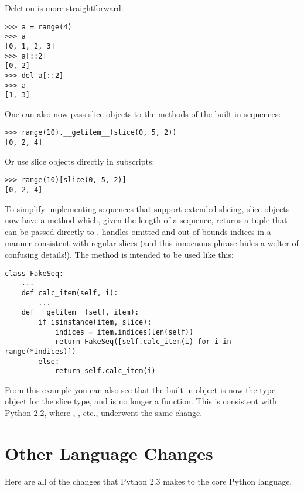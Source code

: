 \documentclass{howto}
\begin{document}
Deletion is more straightforward:

\begin{verbatim}
>>> a = range(4)
>>> a
[0, 1, 2, 3]
>>> a[::2]
[0, 2]
>>> del a[::2]
>>> a
[1, 3]
\end{verbatim}

One can also now pass slice objects to the
 methods of the built-in sequences:

\begin{verbatim}
>>> range(10).__getitem__(slice(0, 5, 2))
[0, 2, 4]
\end{verbatim}

Or use slice objects directly in subscripts:

\begin{verbatim}
>>> range(10)[slice(0, 5, 2)]
[0, 2, 4]
\end{verbatim}

To simplify implementing sequences that support extended slicing,
slice objects now have a method  which,
given the length of a sequence, returns a  tuple that can be passed directly to
.
 handles omitted and out-of-bounds indices in a
manner consistent with regular slices (and this innocuous phrase hides
a welter of confusing details!).  The method is intended to be used
like this:

\begin{verbatim}
class FakeSeq:
    ...
    def calc_item(self, i):
        ...
    def __getitem__(self, item):
        if isinstance(item, slice):
            indices = item.indices(len(self))
            return FakeSeq([self.calc_item(i) for i in range(*indices)])
        else:
            return self.calc_item(i)
\end{verbatim}

From this example you can also see that the built-in 
object is now the type object for the slice type, and is no longer a
function.  This is consistent with Python 2.2, where ,
, etc., underwent the same change.


\section{Other Language Changes}

Here are all of the changes that Python 2.3 makes to the core Python
language.
\end{document}
